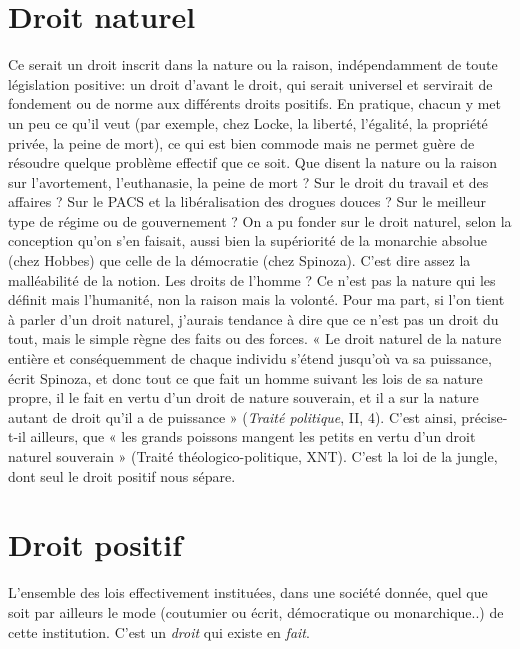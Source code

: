 \section{Droit naturel}
Ce serait un droit inscrit dans la nature ou la raison,
indépendamment de toute législation positive: un
droit d’avant le droit, qui serait universel et servirait de fondement ou de
norme aux différents droits positifs. En pratique, chacun y met un peu ce qu’il
veut (par exemple, chez Locke, la liberté, l'égalité, la propriété privée, la peine
de mort), ce qui est bien commode mais ne permet guère de résoudre
quelque problème effectif que ce soit. Que disent la nature ou la raison sur
l'avortement, l’euthanasie, la peine de mort ? Sur le droit du travail et des
affaires ? Sur le PACS et la libéralisation des drogues douces ? Sur le meilleur
type de régime ou de gouvernement ? On a pu fonder sur le droit naturel, selon
la conception qu’on s’en faisait, aussi bien la supériorité de la monarchie
absolue (chez Hobbes) que celle de la démocratie (chez Spinoza). C’est dire
assez la malléabilité de la notion. Les droits de l’homme ? Ce n’est pas la nature
qui les définit mais l’humanité, non la raison mais la volonté. Pour ma part, si
l’on tient à parler d’un droit naturel, j’aurais tendance à dire que ce n’est pas un
droit du tout, mais le simple règne des faits ou des forces. « Le droit naturel de
la nature entière et conséquemment de chaque individu s’étend jusqu'où va sa
puissance, écrit Spinoza, et donc tout ce que fait un homme suivant les lois de
sa nature propre, il le fait en vertu d’un droit de nature souverain, et il a sur la
nature autant de droit qu’il a de puissance » ({\it Traité politique}, II, 4). C’est ainsi,
précise-t-il ailleurs, que « les grands poissons mangent les petits en vertu d’un
droit naturel souverain » ({\it }Traité théologico-politique, XNT). C’est la loi de la
jungle, dont seul le droit positif nous sépare.

\section{Droit positif}
L'ensemble des lois effectivement instituées, dans une
société donnée, quel que soit par ailleurs le mode (coutumier
ou écrit, démocratique ou monarchique..) de cette institution. C’est un
{\it droit} qui existe en {\it fait}.

